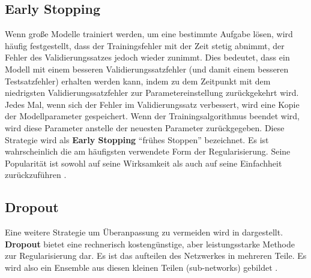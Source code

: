         \subsection{Early Stopping}
        Wenn große Modelle trainiert werden, um eine bestimmte Aufgabe lösen, wird häufig festgestellt, dass der Trainingsfehler mit der Zeit stetig abnimmt, der Fehler des Validierungssatzes jedoch wieder zunimmt. Dies bedeutet, dass ein Modell mit einem besseren Validierungssatzfehler (und damit einem besseren Testsatzfehler) erhalten werden kann, indem zu dem Zeitpunkt mit dem niedrigsten Validierungssatzfehler zur Parametereinstellung zurückgekehrt wird. Jedes Mal, wenn sich der Fehler im Validierungssatz verbessert, wird eine Kopie der Modellparameter gespeichert. Wenn der Trainingsalgorithmus beendet wird, wird diese Parameter anstelle der neuesten Parameter zurückgegeben. Diese Strategie wird als \textbf{Early Stopping} \enquote{frühes Stoppen} bezeichnet. Es ist wahrscheinlich die am häufigsten verwendete Form der Regularisierung. Seine Popularität ist sowohl auf seine Wirksamkeit als auch auf seine Einfachheit zurückzuführen \cite*[246]{IanGoodfellowYoshuaBengio2016}.


        \subsection{Dropout}
        Eine weitere Strategie um Überanpassung zu vermeiden wird in \cite*{Srivastava2014} dargestellt. \textbf{Dropout} bietet eine rechnerisch kostengünstige, aber leistungsstarke Methode zur Regularisierung dar. Es ist das aufteilen des Netzwerkes in mehreren Teile. Es wird also ein Ensemble aus diesen kleinen Teilen (sub-networks) gebildet \cite*[258]{IanGoodfellowYoshuaBengio2016}.



